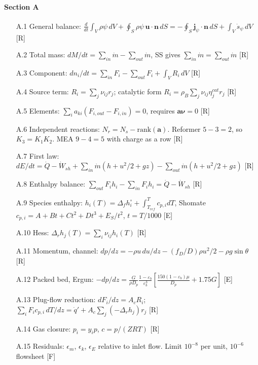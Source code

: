 \paragraph{Section A}
\begin{enumerate}[leftmargin=1.4cm,itemsep=0pt,topsep=2pt,parsep=0pt]\small
\item[A.1] General balance: $\frac{d}{dt}\int_V\rho\psi\,dV+\oint_S\rho\psi\,\mathbf u\cdot\mathbf n\,dS=-\oint_S\mathbf j_\psi\cdot\mathbf n\,dS+\int_V\dot s_\psi\,dV$ {\footnotesize [R]}
\item[A.2] Total mass: $dM/dt=\sum_{in}\dot m-\sum_{out}\dot m$, SS gives $\sum_{in}\dot m=\sum_{out}\dot m$ {\footnotesize [R]}
\item[A.3] Component: $dn_i/dt=\sum_{in}F_i-\sum_{out}F_i+\int_VR_i\,dV$ {\footnotesize [R]}
\item[A.4] Source term: $R_i=\sum_j\nu_{ij}r_j$; catalytic form $R_i=\rho_B\sum_j\nu_{ij}\eta_j^{cat}r_j$ {\footnotesize [R]}
\item[A.5] Elements: $\sum_ia_{ki}(F_{i,out}-F_{i,in})=0$, requires $\mathbf a\boldsymbol\nu=0$ {\footnotesize [R]}
\item[A.6] Independent reactions: $N_r=N_s-\mathrm{rank}(\mathbf a)$. Reformer $5-3=2$, so $K_3=K_1K_2$. MEA $9-4=5$ with charge as a row {\footnotesize [R]}
\item[A.7] First law: $dE/dt=\dot Q-\dot W_{sh}+\sum_{in}\dot m(h+u^2/2+gz)-\sum_{out}\dot m(h+u^2/2+gz)$ {\footnotesize [R]}
\item[A.8] Enthalpy balance: $\sum_{out}F_ih_i-\sum_{in}F_ih_i=\dot Q-\dot W_{sh}$ {\footnotesize [R]}
\item[A.9] Species enthalpy: $h_i(T)=\Delta_fh_i^\circ+\int_{T_{ref}}^Tc_{p,i}dT$, Shomate $c_{p,i}=A+Bt+Ct^2+Dt^3+E_S/t^2$, $t=T/1000$ {\footnotesize [E]}
\item[A.10] Hess: $\Delta_rh_j(T)=\sum_i\nu_{ij}h_i(T)$ {\footnotesize [R]}
\item[A.11] Momentum, channel: $dp/dz=-\rho u\,du/dz-(f_D/D)\rho u^2/2-\rho g\sin\theta$ {\footnotesize [R]}
\item[A.12] Packed bed, Ergun: $-dp/dz=\frac{G}{\rho D_p}\frac{1-\varepsilon_b}{\varepsilon_b^3}\left[\frac{150(1-\varepsilon_b)\mu}{D_p}+1.75G\right]$ {\footnotesize [E]}
\item[A.13] Plug-flow reduction: $dF_i/dz=A_cR_i$; $\sum_iF_ic_{p,i}\,dT/dz=\dot q'+A_c\sum_j(-\Delta_rh_j)r_j$ {\footnotesize [R]}
\item[A.14] Gas closure: $p_i=y_ip$, $c=p/(ZRT)$ {\footnotesize [R]}
\item[A.15] Residuals: $\epsilon_m$, $\epsilon_k$, $\epsilon_E$ relative to inlet flow. Limit $10^{-8}$ per unit, $10^{-6}$ flowsheet {\footnotesize [F]}
\end{enumerate}
